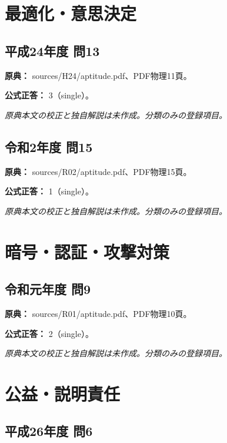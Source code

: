 \section{最適化・意思決定}

\subsection{平成24年度 問13}
\label{q:h24-reg-apt-13}

\noindent\textbf{原典：} sources/H24/aptitude.pdf、PDF物理11頁。

\textbf{公式正答：} 3（single）。

\par\textit{原典本文の校正と独自解説は未作成。分類のみの登録項目。}

\subsection{令和2年度 問15}
\label{q:r02-reg-apt-15}

\noindent\textbf{原典：} sources/R02/aptitude.pdf、PDF物理15頁。

\textbf{公式正答：} 1（single）。

\par\textit{原典本文の校正と独自解説は未作成。分類のみの登録項目。}

\section{暗号・認証・攻撃対策}

\subsection{令和元年度 問9}
\label{q:r01-reg-apt-09}

\noindent\textbf{原典：} sources/R01/aptitude.pdf、PDF物理10頁。

\textbf{公式正答：} 2（single）。

\par\textit{原典本文の校正と独自解説は未作成。分類のみの登録項目。}

\section{公益・説明責任}

\subsection{平成26年度 問6}
\label{q:h26-reg-apt-06}

